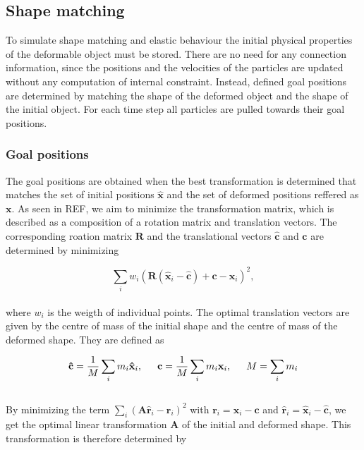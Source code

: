 \subsection{Shape matching}

To simulate shape matching and elastic behaviour the initial physical properties of the deformable
object must be stored. There are no need for any connection information, since the positions and the velocities of the particles 
are updated without any computation of internal constraint. Instead, defined goal positions are determined by matching the shape of the deformed 
object and the shape of the initial object. For each time step all particles are pulled towards their goal positions.

\subsubsection{Goal positions}
The goal positions are obtained when the best transformation is determined that matches the set of initial positions 
$\mathbf{\hat{x}}$ and the set of deformed positions reffered as $\mathbf{x}$. As seen in REF, we aim to minimize the transformation matrix, 
which is described as a composition of a rotation matrix 
and translation vectors. The corresponding roation matrix $\mathbf{R}$ and the translational vectors
$\mathbf{\hat{c}}$ and $\mathbf{c}$ are determined by minimizing 

\begin{equation}
\label{eq:MinR}
\sum\limits_{i} w_{i}\left(\mathbf{R}(\mathbf{\hat{x}}_{i} - \mathbf{\hat{c}}) + \mathbf{c} - \mathbf{x}_{i} \right)^{2},
\end{equation}
\\
where $w_{i}$ is the weigth of individual points. The optimal translation vectors are given by the centre of mass of the initial shape and the centre of mass
of the deformed shape. They are defined as

\begin{equation}
\label{eq:TransVec}
\mathbf{\hat{c}} = \frac{1}{M} \sum\limits_{i} m_{i}\mathbf{\hat{x}}_{i} , \indent
\mathbf{c} = \frac{1}{M} \sum\limits_{i} m_{i}\mathbf{x}_{i} , \indent
M = \sum\limits_{i} m_{i} 
\end{equation}
\\
By minimizing the term $\sum\limits_{i} (\mathbf{A}\mathbf{\hat{r}}_{i} - \mathbf{r}_{i})^2$ with $ \mathbf{r}_{i} = \mathbf{x}_{i} - 
\mathbf{c}$ and $\mathbf{\hat{r}}_{i} = \mathbf{\hat{x}}_{i} - \mathbf{\hat{c}} $, we get the optimal linear transformation $\mathbf{A}$
of the initial and deformed shape. This transformation is therefore determined by


